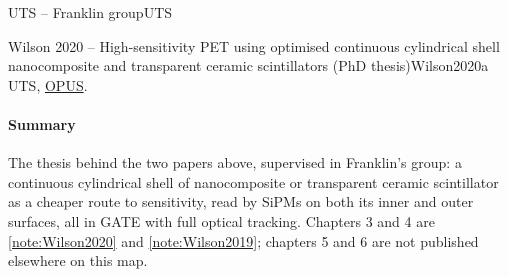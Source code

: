 \begin{programnote}{UTS -- Franklin group}{UTS}
\begin{papernote}{Wilson 2020 -- High-sensitivity PET using optimised continuous cylindrical shell nanocomposite and transparent ceramic scintillators (PhD thesis)}{Wilson2020a}
UTS, \href{https://opus.lib.uts.edu.au/handle/10453/147336}{OPUS}.

\paragraph{Summary}
The thesis behind the two papers above, supervised in Franklin's group: a
continuous cylindrical shell of nanocomposite or transparent ceramic scintillator
as a cheaper route to sensitivity, read by SiPMs on both its inner and outer
surfaces, all in GATE with full optical tracking. Chapters 3 and 4 are
\ref{note:Wilson2020} and \ref{note:Wilson2019}; chapters 5 and 6 are not
published elsewhere on this map.


\end{papernote}
\end{programnote}
